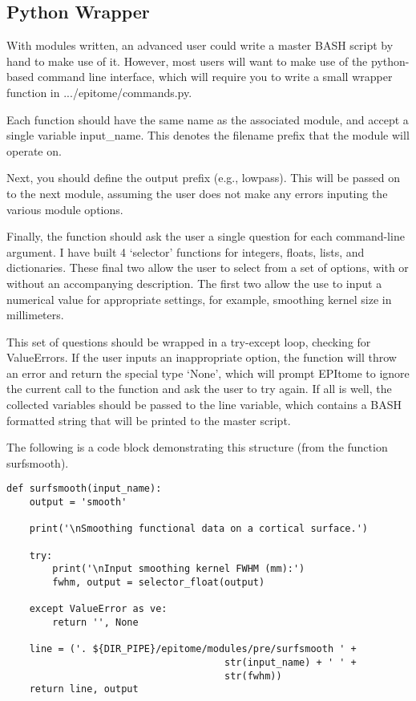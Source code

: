 \documentclass[final,titlepage,letterpaper,oneside,12pt]{article}
\renewcommand{\texttt}[2][BrickRed]{\textcolor{#1}{\ttfamily #2}}%
\begin{document}
\subsection{Python Wrapper}

With modules written, an advanced user could write a master BASH script by hand to make use of it. However, most users will want to make use of the python-based command line interface, which will require you to write a small wrapper function in \texttt{.../epitome/commands.py}.

Each function should have the same name as the associated module, and accept a single variable \texttt{input\_name}. This denotes the filename prefix that the module will operate on.

Next, you should define the output prefix (e.g., \texttt{lowpass}). This will be passed on to the next module, assuming the user does not make any errors inputing the various module options.

Finally, the function should ask the user a single question for each command-line argument. I have built 4 `selector' functions for integers, floats, lists, and dictionaries. These final two allow the user to select from a set of options, with or without an accompanying description. The first two allow the use to input a numerical value for appropriate settings, for example, smoothing kernel size in millimeters.

This set of questions should be wrapped in a try-except loop, checking for ValueErrors. If the user inputs an inappropriate option, the function will throw an error and return the special type `None', which will prompt EPItome to ignore the current call to the function and ask the user to try again. If all is well, the collected variables should be passed to the \texttt{line} variable, which contains a BASH formatted string that will be printed to the master script.

The following is a code block demonstrating this structure (from the function \texttt{surfsmooth}).

\begin{lstlisting}
def surfsmooth(input_name):    
    output = 'smooth'

    print('\nSmoothing functional data on a cortical surface.')

    try:
        print('\nInput smoothing kernel FWHM (mm):')
        fwhm, output = selector_float(output)

    except ValueError as ve:
        return '', None

    line = ('. ${DIR_PIPE}/epitome/modules/pre/surfsmooth ' +
                                      str(input_name) + ' ' +
                                      str(fwhm))
    return line, output
\end{lstlisting}
\end{document}
